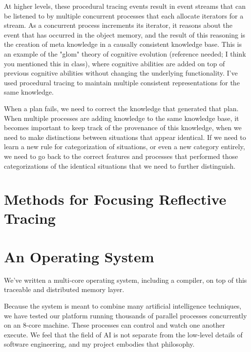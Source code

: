 At higher levels, these procedural tracing events result in event
streams that can be listened to by multiple concurrent processes that
each allocate iterators for a stream.  As a concurrent process
increments its iterator, it reasons about the event that has occurred in
the object memory, and the result of this reasoning is the creation of
meta knowledge in a causally consistent knowledge base.  This is an
example of the "glom" theory of cognitive evolution (reference needed; I
think you mentioned this in class), where cognitive abilities are added
on top of previous cognitive abilities without changing the underlying
functionality.  I've used procedural tracing to maintain multiple
consistent representations for the same knowledge.

When a plan fails, we need to correct the knowledge that generated that
plan.  When multiple processes are adding knowledge to the same
knowledge base, it becomes important to keep track of the provenance of
this knowledge, when we need to make distinctions between situations
that appear identical.  If we need to learn a new rule for
categorization of situations, or even a new category entirely, we need
to go back to the correct features and processes that performed those
categorizations of the identical situations that we need to further
distinguish.

\section{Methods for Focusing Reflective Tracing}
\label{sec:methods_for_focusing_reflective_tracing}


\section{An Operating System}

We've written a multi-core operating system, including a
compiler, on top of this traceable and distributed memory layer.

Because the system is meant to combine many artificial intelligence
techniques, we have tested our platform running thousands of parallel
processes concurrently on an 8-core machine.  These processes can
control and watch one another execute.  We feel that the field of AI
is not separate from the low-level details of software engineering,
and my project embodies that philosophy.


